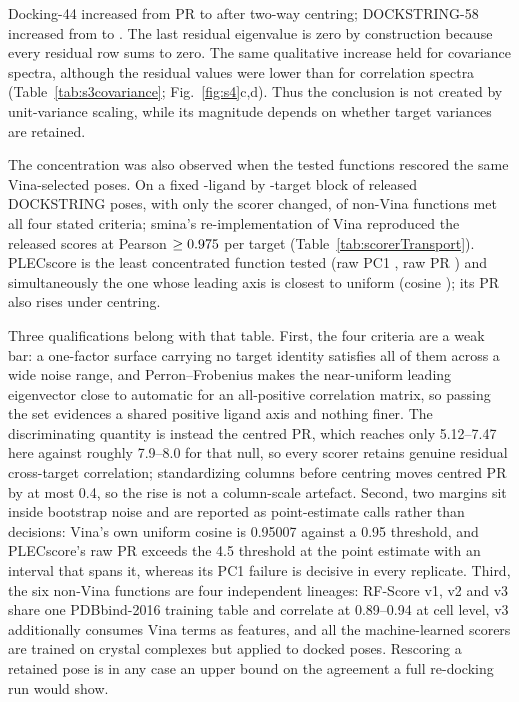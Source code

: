 \documentclass[11pt]{article}
\begin{document}
Docking-44 increased from PR \DffRawPR{} to \DffResidualPR{} after two-way centring;
DOCKSTRING-58 increased from \DsRawPR{} to \DsResidualPR{}. The last residual eigenvalue is
zero by construction because every residual row sums to zero. The same qualitative increase
held for covariance spectra, although the residual values were lower than for correlation
spectra (Table~\ref{tab:s3covariance}; Fig.~\ref{fig:s4}c,d). Thus the conclusion is not
created by unit-variance scaling, while its magnitude depends on whether target variances are
retained.

The concentration was also observed when the tested functions rescored the same
Vina-selected poses. On a fixed \TransportLigands{}-ligand by
\TransportTargets{}-target block of released DOCKSTRING poses, with only the scorer changed,
\TransportSupportingScorers{} of \TransportNonVinaScorers{}
non-Vina functions met all four stated criteria; smina's re-implementation of Vina
reproduced the released scores at Pearson $\ge0.975{}$ per target
(Table~\ref{tab:scorerTransport}). PLECscore is the least concentrated function tested (raw
PC1 \TransportPlecRawPCOne{}, raw PR \TransportPlecRawPR{}) and simultaneously the one whose
leading axis is closest to uniform (cosine \TransportPlecUniformCosine{}); its PR also rises
under centring.

Three qualifications belong with that table. First, the four criteria are a weak bar: a
one-factor surface carrying no target identity satisfies all of them across a wide noise
range, and Perron--Frobenius makes the near-uniform leading eigenvector close to automatic
for an all-positive correlation matrix, so passing the set evidences a shared positive
ligand axis and nothing finer. The discriminating quantity is instead the centred PR, which
reaches only 5.12--7.47 here against roughly 7.9--8.0 for that null, so every scorer retains
genuine residual cross-target correlation; standardizing columns before centring moves
centred PR by at most 0.4, so the rise is not a column-scale artefact. Second, two margins
sit inside bootstrap noise and are reported as point-estimate calls rather than decisions:
Vina's own uniform cosine is 0.95007 against a 0.95 threshold, and PLECscore's raw PR
exceeds the 4.5 threshold at the point estimate with an interval that spans it, whereas its
PC1 failure is decisive in every replicate. Third, the six non-Vina functions are four
independent lineages: RF-Score v1, v2 and v3 share one PDBbind-2016 training table and
correlate at 0.89--0.94 at cell level, v3 additionally consumes Vina terms as features, and
all the machine-learned scorers are trained on crystal complexes but applied to docked poses.
Rescoring a retained pose is in any case an upper bound on the agreement a full re-docking
run would show.
\end{document}
